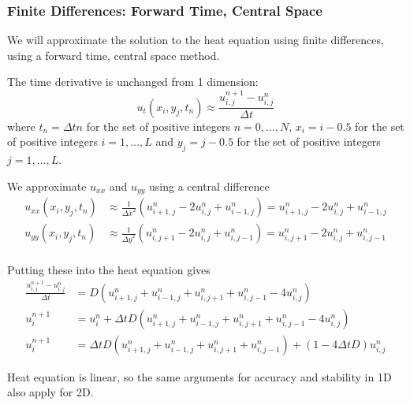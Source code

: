 \documentclass[11pt,a4paper,noindent]{article}
\begin{document}
\subsubsection{Finite Differences: Forward Time, Central Space}
We will approximate the solution to the heat equation using finite differences, using a forward time, central space method.

The time derivative is unchanged from 1 dimension:
\begin{equation}
u_t(x_{i},y_{j},t_n) \approx \frac{u^{n+1}_{i,j}-u^{n}_{i,j}}{\Delta t}
\end{equation}
where $t_n = \Delta t n$ for the set of positive integers $n = 0,\ldots, N$, $x_i = i-0.5$ for the set of positive integers $i = 1, \ldots, L$ and $y_j = j-0.5$ for the set of positive integers $j = 1, \ldots, L$.

We approximate $u_{xx}$ and $u_{yy}$ using a central difference
\begin{align}
u_{xx}(x_{i},y_{j},t_n) &\approx \frac{1}{{\Delta x}^2} (u^n_{i+1,j} - 2u^n_{i,j} + u^n_{i-1,j}) = u^n_{i+1,j} - 2u^n_{i,j} + u^n_{i-1,j} \\
u_{yy}(x_{i},y_{j},t_n) &\approx \frac{1}{{\Delta y}^2} (u^n_{i,j+1} - 2u^n_{i,j} + u^n_{i,j-1}) = u^n_{i,j+1} - 2u^n_{i,j} + u^n_{i,j-1} \\
\end{align}

Putting these into the heat equation gives
\begin{align} \label{eq:finitedifference}
\frac{u^{n+1}_{i,j}-u^{n}_{i,j}}{\Delta t} &= D (u^n_{i+1,j} + u^n_{i-1,j} + u^n_{i,j+1} + u^n_{i,j-1} - 4u^n_{i,j}) \\
u^{n+1}_i &= u^{n}_i + \Delta t D (u^n_{i+1,j} + u^n_{i-1,j} + u^n_{i,j+1} + u^n_{i,j-1} - 4u^n_{i,j}) \\
u^{n+1}_i &= \Delta t D (u^n_{i+1,j} + u^n_{i-1,j} + u^n_{i,j+1} + u^n_{i,j-1}) + (1-4\Delta t D)u^n_{i,j}
\end{align}

Heat equation is linear, so the same arguments for accuracy and stability in 1D also apply for 2D.
\end{document}
